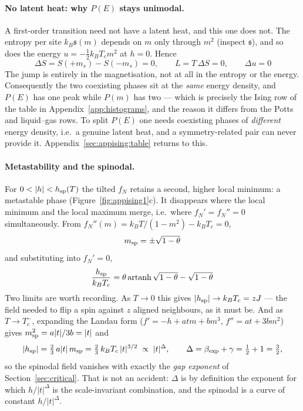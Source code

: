 \documentclass[10pt,a4paper]{article}
\theoremstyle{remark}
\begin{document}
\paragraph{No latent heat: why $P(E)$ stays unimodal.} A first-order transition
need not have a latent heat, and this one does not. The entropy per site
$k_B\mathfrak{s}(m)$ depends on $m$ only through $m^{2}$ (inspect
$\mathfrak{s}$), and so does the energy $u=-\tfrac12k_BT_cm^{2}$ at $h=0$. Hence
\[
\;
\Delta S=S(+m_s)-S(-m_s)=0,
\qquad
L=T\,\Delta S=0,
\qquad
\Delta u=0\
\]
The jump is entirely in the magnetisation, not at all in the entropy or the
energy. Consequently the two coexisting phases sit at the \emph{same} energy
density, and $P(E)$ has one peak while $P(m)$ has two --- which is precisely the
Ising row of the table in Appendix~\ref{app:histograms}, and the reason it differs
from the Potts and liquid--gas rows. To split $P(E)$ one needs coexisting phases
of \emph{different} energy density, i.e.\ a genuine latent heat, and a
symmetry-related pair can never provide it. Appendix~\ref{sec:appising:table}
returns to this.

\paragraph{Metastability and the spinodal.} For $0<|h|<h_{\rm sp}(T)$ the tilted
$f_N$ retains a second, higher local minimum: a metastable phase
(Figure~\ref{fig:appising1}c). It disappears where the local minimum and the
local maximum merge, i.e.\ where $f_N'=f_N''=0$ simultaneously. From
$f_N''(m)=k_BT/(1-m^{2})-k_BT_c=0$,
\[
\;m_{\rm sp}=\pm\sqrt{1-\theta}\
\]
and substituting into $f_N'=0$,
\[
\;
\frac{h_{\rm sp}}{k_BT_c}
=\theta\operatorname{artanh}\sqrt{1-\theta}-\sqrt{1-\theta}\
\]
Two limits are worth recording. As $T\to0$ this gives $|h_{\rm sp}|\to k_BT_c=zJ$
--- the field needed to flip a spin against $z$ aligned neighbours, as it must be.
And as $T\to T_c^{-}$, expanding the Landau form ($f'=-h+atm+bm^{3}$,
$f''=at+3bm^{2}$) gives $m_{\rm sp}^{2}=a|t|/3b=|t|$ and
\[
|h_{\rm sp}|=\tfrac23\,a|t|\,m_{\rm sp}=\tfrac23\,k_BT_c\,|t|^{3/2}
\;\propto\;|t|^{\Delta},
\qquad \Delta=\beta_{\rm exp}+\gamma=\tfrac12+1=\tfrac32 ,
\]
so the spinodal field vanishes with exactly the \emph{gap exponent} of
Section~\ref{sec:critical}. That is not an accident: $\Delta$ is by
definition the exponent for which $h/|t|^{\Delta}$ is the scale-invariant
combination, and the spinodal is a curve of constant $h/|t|^{\Delta}$.
\end{document}
